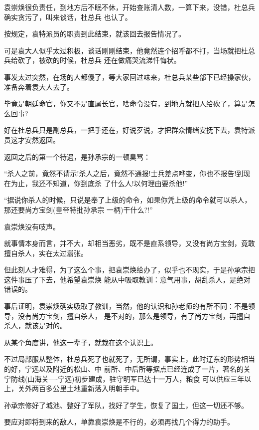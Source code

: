 \documentclass[11pt,a4paper,onecolumn]{article}
\begin{document}
袁崇焕很负责任，到地方后不眠不休，开始查账清人数，一算下来，没错，杜总兵确实贪污了，叫来谈话，杜总兵
也认了。

按规定，袁特派员的职责到此结束，就该回去报告情况了。

可是袁大人似乎太过积极，谈话刚刚结束，他竟然连个招呼都不打，当场就把杜总兵给砍了，被砍的时候，杜总兵
还在做痛哭流涕忏悔状。

事发太过突然，在场的人都傻了，等大家回过味来，杜总兵某些部下已经操家伙，准备奔着袁大人去了。

毕竟是朝廷命官，你又不是直属长官，啥命令没有，到地方就把人给砍了，算是怎么回事?

好在杜总兵只是副总兵，一把手还在，好说歹说，才把群众情绪安抚下去，袁特派员这才安然返回。

返回之后的第一个待遇，是孙承宗的一顿臭骂：

``杀人之前，竟然不请示!杀人之后，竟然不通报!士兵差点哗变，你也不报告!到现在为止，我还不知道，你到底杀
了什么人!以何理由要杀他!''

``据说你杀人的时候，只说是奉了上级的命令，如果你凭上级的命令就可以杀人，那还要尚方宝剑(皇帝特批孙承宗
一柄)干什么?!''

袁崇焕没有吱声。

就事情本身而言，并不大，却相当恶劣，既不是直系领导，又没有尚方宝剑，竟敢擅自杀人，实在太过嚣张。

但此刻人才难得，为了这么个事，把袁崇焕给办了，似乎也不现实，于是孙承宗把这件事压了下去，他希望袁崇焕
能从中吸取教训：意气用事，胡乱杀人，是绝对错误的。

事后证明，袁崇焕确实吸取了教训，当然，他的认识和孙老师的有所不同：不是领导，没有尚方宝剑，擅自杀人，
是不对的，那么是领导，有了尚方宝剑，再擅自杀人，就该是对的。

从某个角度讲，他这一辈子，就栽在这个认识上。

不过局部服从整体，杜总兵死了也就死了，无所谓，事实上，此时辽东的形势相当的好，宁远以及附近的松山、中
前所、中后所等据点已经连成了一片，著名的关宁防线(山海关----宁远)初步建成，驻守明军已达十一万人，粮食
可以供应三年以上，关外两百多公里土地重新落入明朝手中。

孙承宗修好了城池、整好了军队，找好了学生，恢复了国土，但这一切还不够。

要应对即将到来的敌人，单靠袁崇焕是不行的，必须再找几个得力的助手。

\section[\thesection]{}
\end{document}
